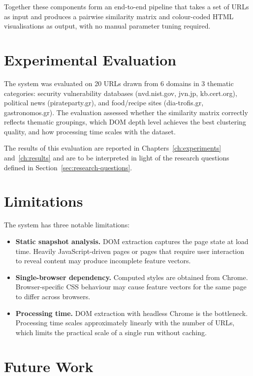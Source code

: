 Together these components form an end-to-end pipeline that takes a set of URLs as input and produces a pairwise similarity matrix and colour-coded HTML visualisations as output, with no manual parameter tuning required.

\section{Experimental Evaluation}
\label{sec:eval-summary}

The system was evaluated on 20 URLs drawn from 6 domains in 3 thematic categories: security vulnerability databases (nvd.nist.gov, jvn.jp, kb.cert.org), political news (pirateparty.gr), and food/recipe sites (dia-trofis.gr, gastronomos.gr). The evaluation assessed whether the similarity matrix correctly reflects thematic groupings, which DOM depth level achieves the best clustering quality, and how processing time scales with the dataset.

The results of this evaluation are reported in Chapters~\ref{ch:experiments} and~\ref{ch:results} and are to be interpreted in light of the research questions defined in Section~\ref{sec:research-questions}.

\section{Limitations}
\label{sec:limitations}

The system has three notable limitations:

\begin{itemize}
    \item \textbf{Static snapshot analysis.} DOM extraction captures the page state at load time. Heavily JavaScript-driven pages or pages that require user interaction to reveal content may produce incomplete feature vectors.

    \item \textbf{Single-browser dependency.} Computed styles are obtained from Chrome. Browser-specific CSS behaviour may cause feature vectors for the same page to differ across browsers.

    \item \textbf{Processing time.} DOM extraction with headless Chrome is the bottleneck. Processing time scales approximately linearly with the number of URLs, which limits the practical scale of a single run without caching.
\end{itemize}

\section{Future Work}
\label{sec:future-work}


